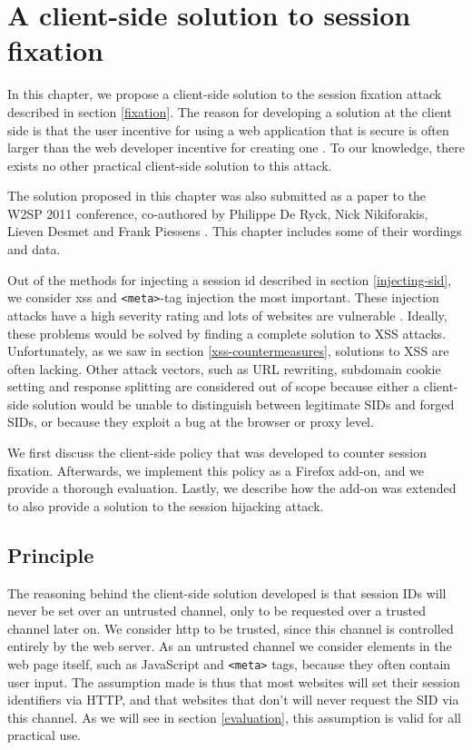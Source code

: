 \chapter{A client-side solution to session fixation}\label{fixation-solution}
In this chapter, we propose a client-side solution to the \gls{session fixation} attack described in section \ref{fixation}. The reason for developing a solution at the client side is that the user incentive for using a web application that is secure is often larger than the web developer incentive for creating one \cite{Johns2011}. To our knowledge, there exists no other practical client-side solution to this attack.

The solution proposed in this chapter was also submitted as a paper to the W2SP 2011 conference, co-authored by Philippe De Ryck, Nick Nikiforakis, Lieven Desmet and Frank Piessens \cite{Bonne2011}. This chapter includes some of their wordings and data.

Out of the methods for injecting a \gls{session id} described in section \ref{injecting-sid}, we consider \gls{xss} and \texttt{<meta>}-tag injection the most important. These injection attacks have a high severity rating \cite{Williams2010} and lots of websites are vulnerable \cite{Brown2010}. Ideally, these problems would be solved by finding a complete solution to XSS attacks. Unfortunately, as we saw in section \ref{xss-countermeasures}, solutions to XSS are often lacking. Other attack vectors, such as URL rewriting, subdomain cookie setting and response splitting are considered out of scope because either a client-side solution would be unable to distinguish between legitimate SIDs and forged SIDs, or because they exploit a bug at the browser or proxy level.

We first discuss the client-side policy that was developed to counter session fixation. Afterwards, we implement this policy as a Firefox add-on, and we provide a thorough evaluation. Lastly, we describe how the add-on was extended to also provide a solution to the session hijacking attack.

\section{Principle}

The reasoning behind the client-side solution developed is that session IDs will never be set over an untrusted channel, only to be requested over a trusted channel later on. We consider \gls{http} to be trusted, since this channel is controlled entirely by the web server. As an untrusted channel we consider elements in the web page itself, such as JavaScript and \texttt{<meta>} tags, because they often contain user input. The assumption made is thus that most websites will set their session identifiers via HTTP, and that websites that don't will never request the SID via this channel. As we will see in section \ref{evaluation}, this assumption is valid for all practical use.

